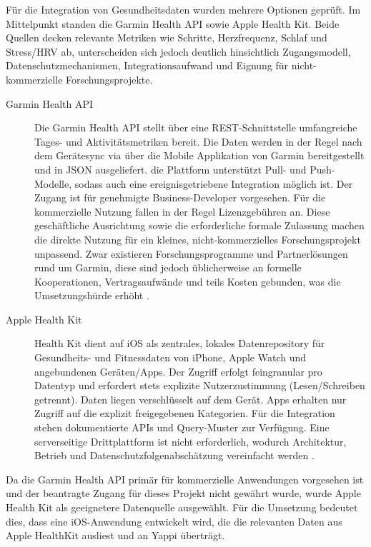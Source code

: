 \documentclass[12pt,a4paper]{report}
\begin{document}
Für die Integration von Gesundheitsdaten wurden mehrere Optionen geprüft. Im Mittelpunkt standen die Garmin Health API sowie Apple
Health Kit. Beide Quellen decken relevante Metriken wie Schritte, Herzfrequenz, Schlaf und Stress/HRV ab, unterscheiden sich jedoch
deutlich hinsichtlich Zugangsmodell, Datenschutzmechanismen, Integrationsaufwand und Eignung für nicht-kommerzielle
Forschungsprojekte.

\begin{description}
  \item[Garmin Health API] Die Garmin Health API stellt über eine REST-Schnittstelle umfangreiche Tages- und Aktivitätsmetriken
    bereit. Die Daten werden in der Regel nach dem Gerätesync via über die Mobile Applikation von Garmin bereitgestellt und in
    JSON ausgeliefert. die Plattform unterstützt Pull- und Push-Modelle, sodass auch eine ereignisgetriebene Integration möglich
    ist. Der Zugang ist für genehmigte Business-Developer vorgesehen. Für die kommerzielle Nutzung fallen in der Regel
    Lizenzgebühren an. Diese geschäftliche Ausrichtung sowie die erforderliche formale Zulassung machen die direkte Nutzung für
    ein kleines, nicht-kommerzielles Forschungsprojekt unpassend. Zwar existieren Forschungsprogramme und Partnerlösungen rund um
    Garmin, diese sind jedoch üblicherweise an formelle Kooperationen, Vertragsaufwände und teils Kosten gebunden, was die
    Umsetzungshürde erhöht \cite{garmin_healthapi_2025}.
  \item[Apple Health Kit] Health Kit dient auf iOS als zentrales, lokales Datenrepository für Gesundheits- und Fitnessdaten von
    iPhone, Apple Watch und angebundenen Geräten/Apps. Der Zugriff erfolgt feingranular pro Datentyp und erfordert stets explizite
    Nutzerzustimmung (Lesen/Schreiben getrennt). Daten liegen verschlüsselt auf dem Gerät. Apps erhalten nur Zugriff auf die
    explizit freigegebenen Kategorien. Für die Integration stehen dokumentierte APIs und Query-Muster zur Verfügung. Eine
    serverseitige Drittplattform ist nicht erforderlich, wodurch Architektur, Betrieb und Datenschutzfolgenabschätzung vereinfacht
    werden \cite{apple_healthkit_2025}.
\end{description}

Da die Garmin Health API primär für kommerzielle Anwendungen vorgesehen ist und der beantragte Zugang für dieses Projekt nicht
gewährt wurde, wurde Apple Health Kit als geeignetere Datenquelle ausgewählt. Für die Umsetzung bedeutet dies, dass eine
iOS-Anwendung entwickelt wird, die die relevanten Daten aus Apple HealthKit ausliest und an Yappi überträgt.
\end{document}
